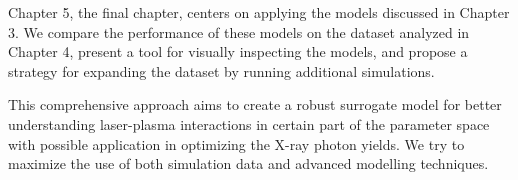 Chapter 5, the final chapter, centers on applying the models discussed in Chapter 3. We compare the performance of these models on the dataset analyzed in Chapter 4, present a tool for visually inspecting the models, and propose a strategy for expanding the dataset by running additional simulations.

This comprehensive approach aims to create a robust surrogate model for better understanding laser-plasma interactions in certain part of the parameter space with possible application in optimizing the X-ray photon yields.  We try to maximize the use of both simulation data and advanced modelling techniques.

